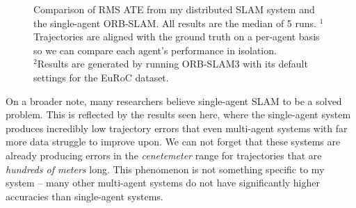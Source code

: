 \begin{figure}[h]
    \captionsetup{format=plain}
    \begin{minipage}[c]{0.5\textwidth}
        \centering

    \end{minipage}\hfill
    \begin{minipage}[c]{0.48\textwidth}
        \caption{Comparison of RMS ATE from my distributed SLAM system and the single-agent ORB-SLAM. All results are the median of 5 runs. \captionbreak $^1$Trajectories are aligned with the ground truth on a per-agent basis so we can compare each agent's performance in isolation. \\ $^2$Results are generated by running ORB-SLAM3 with its default settings for the EuRoC dataset.}
        \label{fig:comparison-to-single-agent-systems}
    \end{minipage}
\end{figure}

On a broader note, many researchers believe single-agent SLAM to be a solved problem. This is reflected by the results seen here, where the single-agent system produces incredibly low trajectory errors that even multi-agent systems with far more data struggle to improve upon. We can not forget that these systems are already producing errors in the \textit{cenetemeter} range for trajectories that are \textit{hundreds of meters} long. This phenomenon is not something specific to my system – many other multi-agent systems do not have significantly higher accuracies than single-agent systems.


